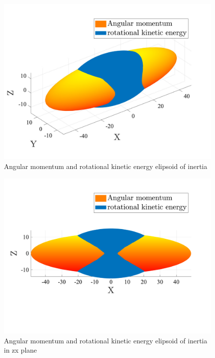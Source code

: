 \begin{figure}[H]
    \caption{Angular momentum and rotational kinetic energy elipsoid of inertia}
    \centering
    \includegraphics[width=16cm]{../Figure/Q1/3Dof_view}
\end{figure}
\vspace{-1.5cm}
\begin{figure}[H]
    \caption{Angular momentum and rotational kinetic energy elipsoid of inertia in zx plane}
    \centering
    \includegraphics[width=12cm]{../Figure/Q1/xz_view}
\end{figure}

